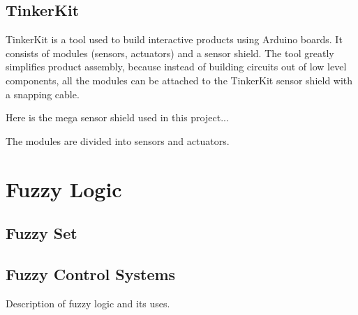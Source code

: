 
\subsection{TinkerKit}

TinkerKit \cite{tinkerkit_introduction} is a tool used to build interactive products using Arduino boards. It consists of modules (sensors, actuators) and a sensor shield. The tool greatly simplifies product assembly, because instead of building circuits out of low level components, all the modules can be attached to the TinkerKit sensor shield with a snapping cable.

Here is the mega sensor shield used in this project...

The modules are divided into sensors and actuators. 




\section{Fuzzy Logic}

\subsection{Fuzzy Set}

\subsection{Fuzzy Control Systems}

Description of fuzzy logic and its uses.






